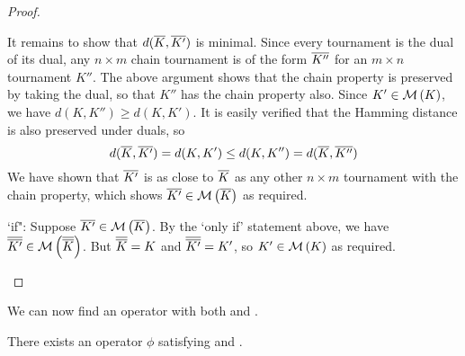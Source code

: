 \begin{proof}
\begin{itemize}
    It remains to show that $d({\overline{K}}, {\overline{K'}})$ is minimal. Since every
    tournament is the dual of its dual, any $n \times m$ chain tournament is of
    the form ${\overline{K''}}$ for an $m \times n$ tournament $K''$. The above
    argument shows that the chain property is preserved by taking the dual, so
    that $K''$ has the chain property also. Since $K' \in \operatorname{\mathcal{M}}\left({K}\right)$, we have
    $d(K, K'') \ge d(K, K')$. It is easily verified that the Hamming distance
    is also preserved under duals, so
    \[
        d({\overline{K}}, {\overline{K'}})
        = d(K, K')
        \le d(K, K'')
        = d({\overline{K}}, {\overline{K''}})
    \]
    We have shown that ${\overline{K'}}$ is as close to ${\overline{K}}$ as any other $n
    \times m$ tournament with the chain property, which shows ${\overline{K'}} \in
    \operatorname{\mathcal{M}}\left({{\overline{K}}}\right)$ as required.

    `if": Suppose ${\overline{K'}} \in \operatorname{\mathcal{M}}\left({{\overline{K}}}\right)$. By the `only if' statement
    above, we have ${\overline{{\overline{K'}}}} \in \operatorname{\mathcal{M}}\left({{\overline{{\overline{K}}}}}\right)$. But
    ${\overline{{\overline{K}}}} = K$ and ${\overline{{\overline{K'}}}} = K'$, so $K' \in \operatorname{\mathcal{M}}\left({K}\right)$ as
    required.
    \end{itemize}
\end{proof}

We can now find an operator with both \chainmin{} and \dualaxiom{}.

\begin{proposition}
    \label{tourn_result_chainmin_dual_compatibility}
    There exists an operator $\phi$ satisfying \chainmin{} and
    \dualaxiom{}.
\end{proposition}

